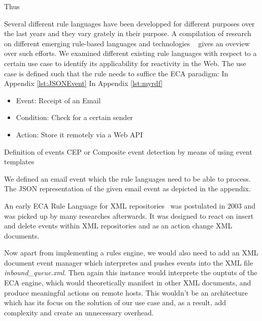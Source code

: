 Thus 





Several different rule languages have been developped for different purposes over the last years and they vary grately in their purpose.
A compilation of research on different emerging rule-based languages and technologies ~\cite{2009-Paschke_Boley-RCER.pdf} gives an oveview over such efforts.
We examined different existing rule languages with respect to a certain use case to identify its applicability for reactivity in the Web. %
The use case is defined such that the rule needs to suffice the ECA paradigm:
In Appendix \ref{lst:JSONEvent}
In Appendix \ref{lst:myrdf}
\begin{itemize}
  \item Event: Receipt of an Email
  \item Condition: Check for a certain sender
  \item Action: Store it remotely via a Web API
\end{itemize}
Definition of events\cite{Adaikkalavan2007}
CEP or Composite event detection by means of using event templates\cite{Zhou2005}



We defined an email event which the rule languages need to be able to process.
The JSON representation of the given email event as depicted in the appendix. %


An early ECA Rule Language for XML repositories~\cite{Papamarkos03event-condition-actionrule} was postulated in 2003 and was picked up by many researches afterwards. It was designed to react on insert and delete events within XML repositories and as an action change XML documents.


Now apart from implementing a rules engine, we would also need to add an XML document event manager which interpretes and pushes events into the XML file \emph{inbound\_queue.xml}. Then again this instance would interprete the ouptuts of the ECA engine, which would theoretically manifest in other XML documents, and produce meaningful actions on remote hosts. This wouldn't be an architecture which has its focus on the solution of our use case and, as a result, add complexity and create an unnecessary overhead.

